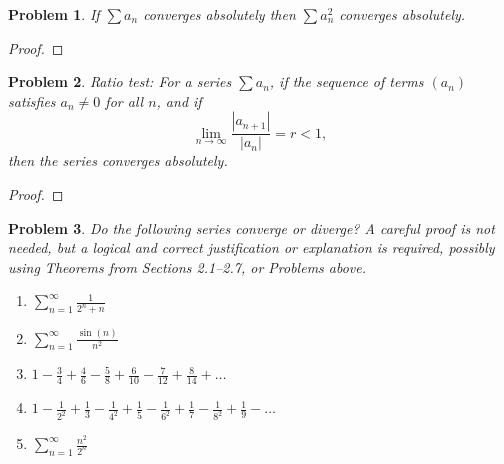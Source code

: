 \documentclass[12pt]{article}
\newtheorem{problem}{Problem}
\begin{document}
\begin{problem} %
If $\sum a_n$ converges absolutely then $\sum a_n^2$ converges absolutely.
\end{problem}

\begin{proof}
\end{proof}


\begin{problem} %
Ratio test:  For a series $\sum a_n$, if the sequence of terms $(a_n)$ satisfies $a_n\ne 0$ for all $n$, and if
	$$\lim_{n\to\infty} \frac{|a_{n+1}|}{|a_n|} = r < 1,$$
then the series converges absolutely.
\end{problem}


\begin{proof}
\end{proof}


\begin{problem} %
Do the following series converge or diverge?  A careful proof is not needed, but a logical and correct justification or explanation is required, possibly using Theorems from Sections 2.1--2.7, or Problems above.

\renewcommand{\labelenumi}{(\alph{enumi})}
\begin{enumerate}
\item $\sum_{n=1}^\infty \frac{1}{2^n+n}$


\item $\sum_{n=1}^\infty \frac{\sin(n)}{n^2}$


\item $1 - \frac{3}{4} + \frac{4}{6} - \frac{5}{8} + \frac{6}{10} - \frac{7}{12} + \frac{8}{14} + \dots$


\item $1 - \frac{1}{2^2} + \frac{1}{3} - \frac{1}{4^2} + \frac{1}{5} - \frac{1}{6^2} + \frac{1}{7} - \frac{1}{8^2} + \frac{1}{9} - \dots$


\item $\sum_{n=1}^\infty \frac{n^2}{2^n}$


\end{enumerate}
\end{problem}
\end{document}
